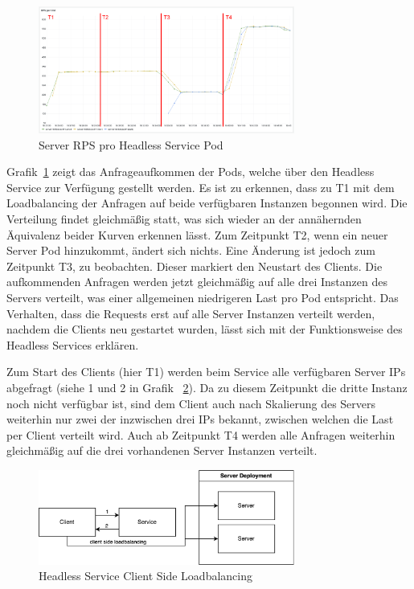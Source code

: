 \begin{figure}[H]
    \centering
    \includegraphics[width=0.75\textwidth]{img/headless_rps}
    \caption{Server RPS pro Headless Service Pod}
    \label{fig:headless_rps}
\end{figure}

Grafik~\ref{fig:headless_rps} zeigt das Anfrageaufkommen der Pods, welche über den Headless Service zur Verfügung gestellt werden.
Es ist zu erkennen, dass zu T1 mit dem Loadbalancing der Anfragen auf beide verfügbaren Instanzen begonnen wird.
Die Verteilung findet gleichmäßig statt, was sich wieder an der annähernden Äquivalenz beider Kurven erkennen lässt.
Zum Zeitpunkt T2, wenn ein neuer Server Pod hinzukommt, ändert sich nichts.
Eine Änderung ist jedoch zum Zeitpunkt T3, zu beobachten.
Dieser markiert den Neustart des Clients.
Die aufkommenden Anfragen werden jetzt gleichmäßig auf alle drei Instanzen des Servers verteilt, was einer allgemeinen niedrigeren Last pro Pod entspricht.
Das Verhalten, dass die Requests erst auf alle Server Instanzen verteilt werden, nachdem die Clients neu gestartet wurden, lässt sich mit der Funktionsweise des Headless Services erklären.

Zum Start des Clients (hier T1) werden beim Service alle verfügbaren Server IPs abgefragt (siehe 1 und 2 in Grafik ~\ref{fig:headless_loadbalancing}).
Da zu diesem Zeitpunkt die dritte Instanz noch nicht verfügbar ist, sind dem Client auch nach Skalierung des Servers weiterhin nur zwei der inzwischen drei IPs bekannt, zwischen welchen die Last per Client verteilt wird.
Auch ab Zeitpunkt T4 werden alle Anfragen weiterhin gleichmäßig auf die drei vorhandenen Server Instanzen verteilt.

\begin{figure}[H]
    \centering
    \includegraphics[width=0.75\textwidth]{img/headless_loadbalancing}
    \caption{Headless Service Client Side Loadbalancing}
    \label{fig:headless_loadbalancing}
\end{figure}

